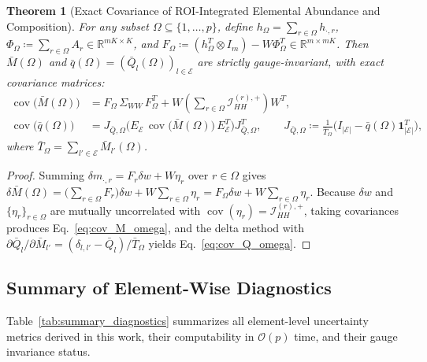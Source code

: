 \documentclass[11pt,a4paper]{article}
\theoremstyle{plain}
\newtheorem{theorem}{Theorem}[section]
\theoremstyle{definition}
\theoremstyle{remark}
\newcommand{\R}{\mathbb{R}}
\newcommand{\E}{\mathcal{E}}
\newcommand{\cI}{\mathcal{I}}
\newcommand{\cov}{\operatorname{cov}}
\newcommand{\one}{\mathbf{1}}
\newcommand{\kron}{\otimes}
\begin{document}
\begin{theorem}[Exact Covariance of ROI-Integrated Elemental Abundance and Composition]
\label{thm:roi_element}
For any subset $\Omega \subseteq \{1,\dots,p\}$, define $h_\Omega = \sum_{r \in \Omega} h_{\cdot, r}$, $\Phi_\Omega \coloneqq \sum_{r \in \Omega} A_r \in \R^{mK \times K}$, and $F_\Omega \coloneqq (h_\Omega^T \kron I_m) - W \Phi_\Omega^T \in \R^{m \times mK}$. Then $\bar{M}(\Omega)$ and $\bar{q}(\Omega) = (\bar{Q}_l(\Omega))_{l\in\E}$ are strictly gauge-invariant, with exact covariance matrices:
\begin{align}
\cov\!\big(\bar{M}(\Omega)\big) &= F_\Omega \, \Sigma_{WW} \, F_\Omega^T + W \left(\sum_{r \in \Omega} \cI_{HH}^{(r),+}\right) W^T, \label{eq:cov_M_omega}\\
\cov\!\big(\bar{q}(\Omega)\big) &= J_{\bar{Q},\Omega} \Big(E_\E \, \cov\!\big(\bar{M}(\Omega)\big)\, E_\E^T\Big) J_{\bar{Q},\Omega}^T, \qquad J_{\bar{Q},\Omega} \coloneqq \frac{1}{\bar{T}_\Omega} \big(I_{|\E|} - \bar{q}(\Omega)\one_{|\E|}^T\big), \label{eq:cov_Q_omega}
\end{align}
where $\bar{T}_\Omega = \sum_{l' \in \E} \bar{M}_{l'}(\Omega)$.
\end{theorem}

\begin{proof}
Summing $\delta m_{\cdot, r} = F_r \delta w + W \eta_r$ over $r \in \Omega$ gives $\delta \bar{M}(\Omega) = \big(\sum_{r\in\Omega} F_r\big)\delta w + W \sum_{r\in\Omega} \eta_r = F_\Omega \delta w + W \sum_{r\in\Omega} \eta_r$. Because $\delta w$ and $\{\eta_r\}_{r\in\Omega}$ are mutually uncorrelated with $\cov(\eta_r) = \cI_{HH}^{(r),+}$, taking covariances produces Eq.~\eqref{eq:cov_M_omega}, and the delta method with $\partial \bar{Q}_l / \partial \bar{M}_{l'} = (\delta_{l,l'} - \bar{Q}_l)/\bar{T}_\Omega$ yields Eq.~\eqref{eq:cov_Q_omega}.
\end{proof}

\subsection{Summary of Element-Wise Diagnostics}
Table~\ref{tab:summary_diagnostics} summarizes all element-level uncertainty metrics derived in this work, their computability in $\mathcal{O}(p)$ time, and their gauge invariance status.
\end{document}
